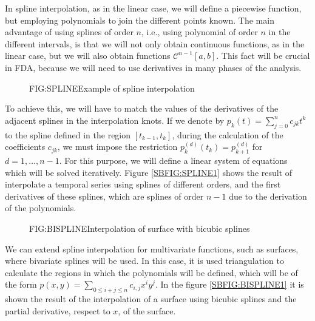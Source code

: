 
In spline interpolation, as in the linear case, we will define a piecewise
function, but employing polynomials to join the different points known.
The main advantage of using splines of order $n$, i.e., using polynomial of
order $n$ in the different intervals, is that we will not only obtain continuous
functions, as in the linear case, but we will also obtain functions
$\mathcal{C}^{n-1}[a,b]$. This fact will be crucial in FDA, because we will need
to use derivatives in many phases of the analysis.

\begin{figure}[Example of spline interpolation]{FIG:SPLINE}{Example of spline interpolation}
	 \quad
\end{figure}

To achieve this, we will have to match the values of the derivatives of the
adjacent splines in the interpolation knots. If we denote by
$p_k(t)=\sum_{j=0}^n c_{jk} t^k$ to the spline defined in the region
$[t_{k-1}, t_{k}]$, during the calculation of the coefficients $c_{jk}$, we must
impose the restriction $p_{k}^{(d)}(t_k) = p_{k+1}^{(d)}$ for \\ $d=1, \dots, n-1$.
For this purpose, we will define a linear system of equations which will be
solved iteratively. Figure \ref{SBFIG:SPLINE1} shows the result of interpolate a
temporal series using splines of different orders, and the first derivatives of
these splines, which are splines of order $n-1$ due to the derivation of the
polynomials.

\begin{figure}[Interpolation of surface]{FIG:BISPLINE}{Interpolation of surface with bicubic splines}
	 \quad
\end{figure}

We can extend spline interpolation for multivariate functions, such as surfaces,
where bivariate splines will be used. In this case, it is used triangulation
to calculate the regions in which the polynomials will be defined, which will
be of the form $p(x, y) = \sum_{0 \le i + j \le n} c_{i,j}x^i y^j$.
In the figure \ref{SBFIG:BISPLINE1} it is shown the result of the
interpolation of a surface using bicubic splines and the partial derivative,
respect to $x$, of the surface.

